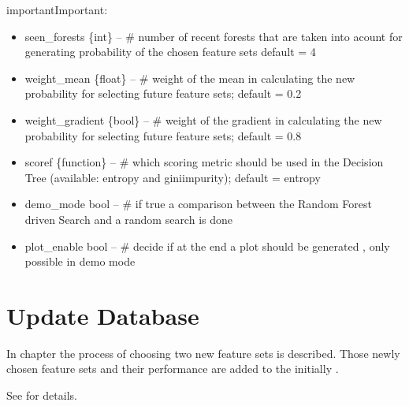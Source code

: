 \documentclass[letterpaper,10pt,english]{sphinxmanual}
\begin{document}
\begin{sphinxadmonition}{important}{Important:}
\begin{fulllineitems}
\begin{itemize}
\item {} 
seen\_forests \{int\} -- \# number of recent forests that are taken into acount for generating probability of the chosen feature sets default = 4

\item {} 
weight\_mean \{float\} -- \# weight of the mean in calculating the new probability for selecting future feature sets; default = 0.2

\item {} 
weight\_gradient \{bool\} -- \# weight of the gradient in calculating the new probability for selecting future feature sets; default = 0.8

\item {} 
scoref \{function\} -- \# which scoring metric should be used in the Decision Tree (available: entropy and giniimpurity); default = entropy

\item {} 
demo\_mode bool -- \# if true a comparison between the Random Forest driven Search and a random search is done

\item {} 
plot\_enable bool -- \# decide if at the end a plot should be generated , only possible in demo mode

\end{itemize}

\end{fulllineitems}

\end{sphinxadmonition}


\section{Update Database}
\label{\detokenize{Update_Database:update-database}}\label{\detokenize{Update_Database::doc}}\label{\detokenize{Update_Database:id1}}
In chapter {\hyperref[\detokenize{RF:random-forest}]{}} the process of choosing two new feature sets is described.
Those newly chosen feature sets and their performance are added to the initially {\hyperref[\detokenize{Generate_Database:compute}]{}}.

See {\hyperref[\detokenize{Update_Database:update-database-fun}]{}} for details.
\end{document}
